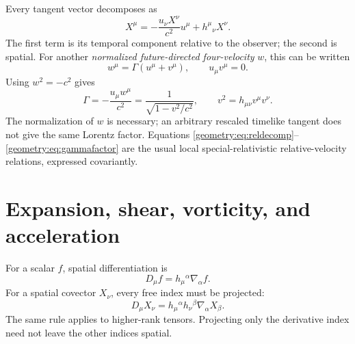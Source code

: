 \documentclass[11pt,oneside]{report}
\theoremstyle{remark}
\numberwithin{definition}{chapter}
\numberwithin{proposition}{chapter}
\numberwithin{remark}{chapter}
\begin{document}
Every tangent vector decomposes as
\begin{equation}
X^\mu=-\frac{u_\nu X^\nu}{c^2}u^\mu+h^\mu{}_{\nu}X^\nu.
\label{geometry:eq:vectordecomp}
\end{equation}
The first term is its temporal component relative to the observer; the second is spatial. For another \emph{normalized future-directed four-velocity} $w$, this can be written
\begin{equation}
w^\mu=\Gamma(u^\mu+v^\mu),\qquad u_\mu v^\mu=0.
\label{geometry:eq:reldecomp}
\end{equation}
Using $w^2=-c^2$ gives
\begin{equation}
\Gamma=-\frac{u_\mu w^\mu}{c^2}
=\frac{1}{\sqrt{1-v^2/c^2}},\qquad
v^2=h_{\mu\nu}v^\mu v^\nu.
\label{geometry:eq:gammafactor}
\end{equation}
The normalization of $w$ is necessary; an arbitrary rescaled timelike tangent does not give the same Lorentz factor. Equations \eqref{geometry:eq:reldecomp}--\eqref{geometry:eq:gammafactor} are the usual local special-relativistic relative-velocity relations, expressed covariantly.

\section{Expansion, shear, vorticity, and acceleration}
For a scalar $f$, spatial differentiation is
\begin{equation}
D_\mu f=h_\mu{}^\alpha\nabla_\alpha f.
\label{geometry:eq:projectedderivative}
\end{equation}
For a spatial covector $X_\nu$, every free index must be projected:
\begin{equation}
D_\mu X_\nu=h_\mu{}^\alpha h_\nu{}^\beta\nabla_\alpha X_\beta.
\end{equation}
The same rule applies to higher-rank tensors. Projecting only the derivative index need not leave the other indices spatial.
\end{document}
